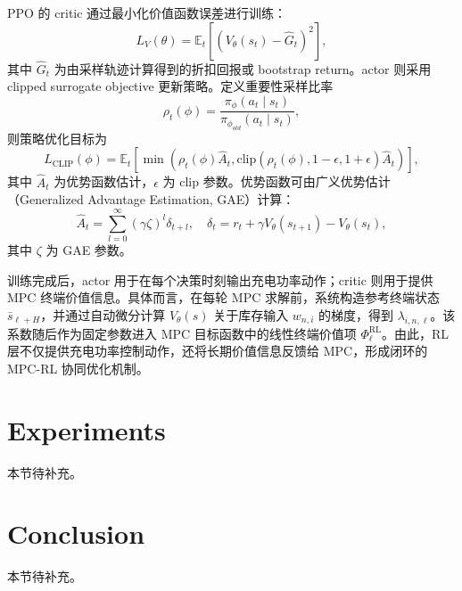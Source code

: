 \documentclass[12pt,hyperref,a4paper,UTF8]{ctexart}
\begin{document}
PPO 的 critic 通过最小化价值函数误差进行训练：
\begin{equation}
L_V(\theta)=
\mathbb{E}_t\left[
\left(V_{\theta}(s_t)-\hat{G}_t\right)^2
\right],
\label{eq:value_loss}
\end{equation}
其中 $\hat{G}_t$ 为由采样轨迹计算得到的折扣回报或 bootstrap return。actor 则采用 clipped surrogate objective 更新策略。定义重要性采样比率
\begin{equation}
\rho_t(\phi)=
\frac{\pi_{\phi}(a_t\mid s_t)}{\pi_{\phi_{old}}(a_t\mid s_t)},
\label{eq:ppo_ratio}
\end{equation}
则策略优化目标为
\begin{equation}
L_{\mathrm{CLIP}}(\phi)=
\mathbb{E}_t\left[
\min\left(
\rho_t(\phi)\hat{A}_t,
\mathrm{clip}(\rho_t(\phi),1-\epsilon,1+\epsilon)\hat{A}_t
\right)
\right],
\label{eq:ppo_clip}
\end{equation}
其中 $\hat{A}_t$ 为优势函数估计，$\epsilon$ 为 clip 参数。优势函数可由广义优势估计（Generalized Advantage Estimation, GAE）计算：
\begin{equation}
\hat{A}_t=\sum_{l=0}^{\infty}(\gamma\zeta)^l\delta_{t+l},
\quad
\delta_t=r_t+\gamma V_{\theta}(s_{t+1})-V_{\theta}(s_t),
\label{eq:gae}
\end{equation}
其中 $\zeta$ 为 GAE 参数。

训练完成后，actor 用于在每个决策时刻输出充电功率动作；critic 则用于提供 MPC 终端价值信息。具体而言，在每轮 MPC 求解前，系统构造参考终端状态 $\bar{s}_{\ell+H}$，并通过自动微分计算 $V_{\theta}(s)$ 关于库存输入 $w_{n,i}$ 的梯度，得到 $\lambda_{i,n,\ell}$。该系数随后作为固定参数进入 MPC 目标函数中的线性终端价值项 $\Phi_{\ell}^{\mathrm{RL}}$。由此，RL 层不仅提供充电功率控制动作，还将长期价值信息反馈给 MPC，形成闭环的 MPC-RL 协同优化机制。

\section{Experiments}

本节待补充。

\section{Conclusion}

本节待补充。


\end{document}
